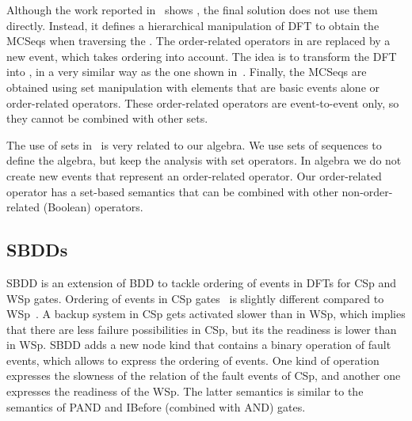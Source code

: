 \documentclass[12pt,openright,twoside,a4paper,oldfontcommands,english,brazil,final]{abntex2}
\theoremstyle{theo}
\begin{document}
Although the work reported in~\cite{TD2004} shows , the final solution does not use them directly. Instead, it defines a hierarchical manipulation of \ac{DFT} to obtain the \acp{MCSeq} when traversing the .
The order-related operators in  are replaced by a new event, which takes ordering into account.
The idea is to transform the \ac{DFT} into , in a very similar way as the one shown in~\cite{TXD2011}.
Finally, the \acp{MCSeq} are obtained using set manipulation with elements that are basic events alone or order-related operators.
These order-related operators are event-to-event only, so they cannot be combined with other sets.

The use of sets in~\cite{TD2004} is very related to our \ac{algebra}.
We use sets of sequences to define the \ac{algebra}, but keep the analysis with set operators.
In \ac{algebra} we do not create new events that represent an order-related operator.
Our order-related operator has a set-based semantics that can be combined with other non-order-related (Boolean) operators.

\subsection{\Aclp*{SBDD}}
\label{sec:sbdd}

\Ac{SBDD} is an extension of \ac{BDD} to tackle ordering of events in \acp{DFT} for \ac{CSp} and \ac{WSp} gates.
Ordering of events in \ac{CSp} gates~\cite{XTD2012} is slightly different compared to \ac{WSp}~\cite{TXD2011}.
A backup system in \ac{CSp} gets activated slower than in \ac{WSp}, which implies that there are less failure possibilities in \ac{CSp}, but its the readiness is lower than in \ac{WSp}.
\Ac{SBDD} adds a new node kind that contains a binary operation of fault events, which allows to express the ordering of events.
One kind of operation expresses the slowness of the relation of the fault events of \ac{CSp}, and another one expresses the readiness of the \ac{WSp}.
The latter semantics is similar to the semantics of \ac{PAND} and \ac{IBefore} (combined with \ac{AND}) gates.
\end{document}
